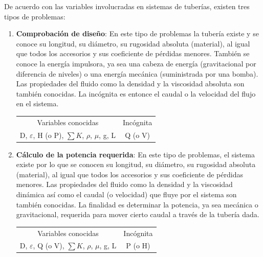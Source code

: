 \documentclass[11pt, oneside]{article}
\begin{document}
De acuerdo con las variables involucradas en sistemas de tuber\'ias, existen tres tipos de problemas:
\begin{enumerate}
\item \textbf{Comprobaci\'on de dise\~no}: En este tipo de problemas la tuber\'ia existe y se conoce su longitud, su di\'ametro, su rugosidad absoluta (material), al igual que todos los accesorios y sus coeficiente de p\'erdidas menores. Tambi\'en se conoce la energ\'ia impulsora, ya sea una cabeza de energ\'ia (gravitacional por diferencia de niveles) o una energ\'ia mec\'anica (suministrada por una bomba). Las propiedades del fluido como la densidad y la viscosidad absoluta son tambi\'en conocidas. La inc\'ognita es entonce el caudal o la velocidad del flujo en el sistema.
\begin{table}[h!]
\centering
\begin{tabular}{c c}
 \hline
 Variables conocidas & Inc\'ognita \\ [0.5ex]
D, $\varepsilon$, H (o P), $\sum K$, $\rho$, $\mu$, g, L & Q (o V) \\
\hline
\end{tabular}
\end{table}
 
\item \textbf{C\'alculo de la potencia requerida}: En este tipo de problemas, el sistema existe por lo que se conocen su longitud, su di\'ametro, su rugosidad absoluta (material), al igual que todos los accesorios y sus coeficiente de p\'erdidas menores. Las propiedades del fluido como la densidad y la viscosidad din\'amica as\'i como el caudal (o velocidad) que fluye por el sistema son tambi\'en conocidas. La finalidad es determinar la potencia, ya sea mec\'anica o gravitacional, requerida para mover cierto caudal a trav\'es de la tuber\'ia dada. 

\begin{table}[h!]
\centering
\begin{tabular}{c c}
 \hline
 Variables conocidas & Inc\'ognita \\ [0.5ex]
D, $\varepsilon$, Q (o V), $\sum K$, $\rho$, $\mu$, g, L & P (o H) \\
\hline
\end{tabular}
\end{table}
 

\end{enumerate}
\end{document}
